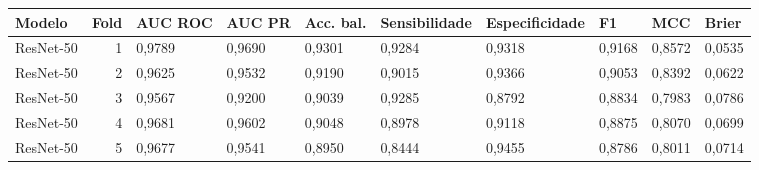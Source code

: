 \begin{tabular}{lrllllllll}
\toprule
Modelo & Fold & AUC ROC & AUC PR & Acc. bal. & Sensibilidade & Especificidade & F1 & MCC & Brier \\
\midrule
ResNet-50 & 1 & 0,9789 & 0,9690 & 0,9301 & 0,9284 & 0,9318 & 0,9168 & 0,8572 & 0,0535 \\
ResNet-50 & 2 & 0,9625 & 0,9532 & 0,9190 & 0,9015 & 0,9366 & 0,9053 & 0,8392 & 0,0622 \\
ResNet-50 & 3 & 0,9567 & 0,9200 & 0,9039 & 0,9285 & 0,8792 & 0,8834 & 0,7983 & 0,0786 \\
ResNet-50 & 4 & 0,9681 & 0,9602 & 0,9048 & 0,8978 & 0,9118 & 0,8875 & 0,8070 & 0,0699 \\
ResNet-50 & 5 & 0,9677 & 0,9541 & 0,8950 & 0,8444 & 0,9455 & 0,8786 & 0,8011 & 0,0714 \\
\bottomrule
\end{tabular}
